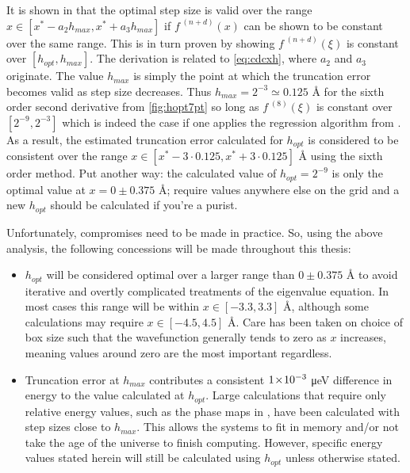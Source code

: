It is shown in \citeauthor{Mathur2012} that the optimal step size is valid over the range $x \in [x^*-a_2h_{max},x^*+a_3h_{max}]$ if $f^{\;(n+d)}(x)$ can be shown to be constant over the same range.
This is in turn proven by showing $f^{\;(n+d)}(\xi)$ is constant over $[h_{opt},h_{max}]$.
The derivation is related to \cref{eq:cdcxh}, where $a_2$ and $a_3$ originate.
The value $h_{max}$ is simply the point at which the truncation error becomes valid as step size decreases.
Thus $h_{max} = 2^{-3} \simeq 0.125$ Å for the sixth order second derivative from \cref{fig:hopt7pt} so long as $f^{\;(8)}(\xi)$ is constant over $[2^{-9},2^{-3}]$ which is indeed the case if one applies the regression algorithm from .
As a result, the estimated truncation error calculated for $h_{opt}$ is considered to be consistent over the range $x \in [x^*-3\cdot0.125,x^*+3\cdot0.125]$ Å using the sixth order method.
Put another way: the calculated value of $h_{opt} = 2^{-9}$ is only the optimal value at $x=0\pm0.375$ Å; require values anywhere else on the grid and a new $h_{opt}$ should be calculated if you're a purist.

Unfortunately, compromises need to be made in practice. So, using the above analysis, the following concessions will be made throughout this thesis:

\begin{itemize}
  \item $h_{opt}$ will be considered optimal over a larger range than $0\pm0.375$ Å to avoid iterative and overtly complicated treatments of the eigenvalue equation.
      In most cases this range will be within $x \in [-3.3, 3.3]$ Å, although some calculations may require $x \in [-4.5, 4.5]$ Å.
      Care has been taken on choice of box size such that the wavefunction generally tends to zero as $x$ increases, meaning values around zero are the most important regardless.
  \item Truncation error at $h_{max}$ contributes a consistent $1\!\times\!10^{-3}$ μeV difference in energy to the value calculated at $h_{opt}$. 
      Large calculations that require only relative energy values, such as the phase maps in , have been calculated with step sizes close to $h_{max}$. 
      This allows the systems to fit in memory and/or not take the age of the universe to finish computing.
      However, specific energy values stated herein will still be calculated using $h_{opt}$ unless otherwise stated.
\end{itemize}




